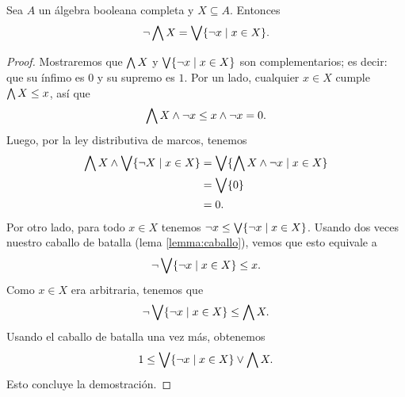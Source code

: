 \begin{lemma}
  Sea $A$ un álgebra booleana completa y $X\subseteq A$.
  Entonces
  \[
    \neg \bigwedge X = \bigvee \{\neg x \mid x\in X\}
  .\]
\end{lemma}
\begin{proof}
  Mostraremos que
  $\bigwedge X$ y $\bigvee \{\neg x \mid x\in X\}$ son complementarios;
  es decir: que su ínfimo es $0$ y su supremo es $1$.
  Por un lado, cualquier $x\in X$ cumple $\bigwedge X\leq x$, así que
  \[
      \bigwedge X\wedge\neg x \leq x\wedge \neg x = 0.
  \]
  Luego, por la ley distributiva de marcos, tenemos
  \begin{align*}
      \bigwedge X \wedge \bigvee\{\neg X\mid x\in X\}
      &= \bigvee\{\bigwedge X \wedge \neg x\mid x\in X\} \\
      &= \bigvee\{0\} \\
      &= 0.
  \end{align*}
  Por otro lado, para todo $x\in X$ tenemos
  $\neg x\leq \bigvee\{\neg x\mid x\in X\}$.
  Usando dos veces nuestro caballo de batalla (lema
  \ref{lemma:caballo}), vemos que esto equivale a
  \[\neg\bigvee\{\neg x\mid x\in X\}\leq x.\]
  Como $x\in X$ era arbitraria, tenemos que
  \[
      \neg\bigvee\{\neg x\mid x\in X\}\leq \bigwedge X
  .\]
  Usando el caballo de batalla una vez más, obtenemos
  \[
      1\leq \bigvee\{\neg x\mid x\in X\} \vee \bigwedge X
  .\]
  Esto concluye la demostración.
\end{proof}

